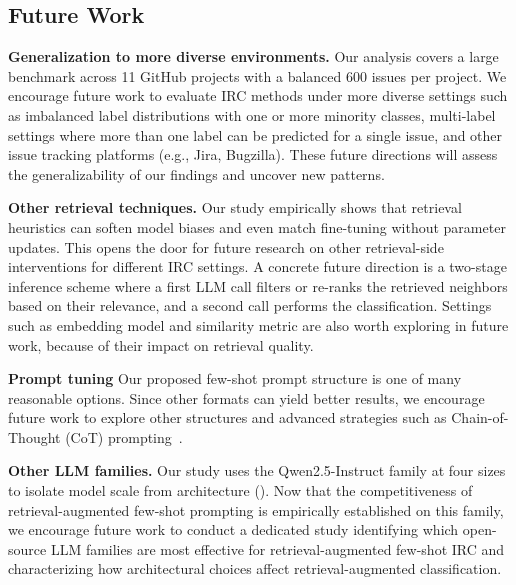 \subsection{Future Work}
\label{sec:disc-future}

\textbf{Generalization to more diverse environments.} Our analysis covers a large benchmark across 11 GitHub projects with a balanced 600 issues per project. We encourage future work to evaluate IRC methods under more diverse settings such as imbalanced label distributions with one or more minority classes, multi-label settings where more than one label can be predicted for a single issue, and other issue tracking platforms (e.g., Jira, Bugzilla). These future directions will assess the generalizability of our findings and uncover new patterns.

\textbf{Other retrieval techniques.} Our study empirically shows that retrieval heuristics can soften model biases and even match fine-tuning without parameter updates. This opens the door for future research on other retrieval-side interventions for different IRC settings. A concrete future direction is a two-stage inference scheme where a first LLM call filters or re-ranks the retrieved neighbors based on their relevance, and a second call performs the classification. Settings such as embedding model and similarity metric are also worth exploring in future work, because of their impact on retrieval quality.

\textbf{Prompt tuning} Our proposed few-shot prompt structure is one of many reasonable options. Since other formats can yield better results, we encourage future work to explore other structures and advanced strategies such as Chain-of-Thought (CoT) prompting~\cite{koyuncu2025exploring}.

\textbf{Other LLM families.} Our study uses the Qwen2.5-Instruct family at four sizes to isolate model scale from architecture (). Now that the competitiveness of retrieval-augmented few-shot prompting is empirically established on this family, we encourage future work to conduct a dedicated study identifying which open-source LLM families are most effective for retrieval-augmented few-shot IRC and characterizing how architectural choices affect retrieval-augmented classification.